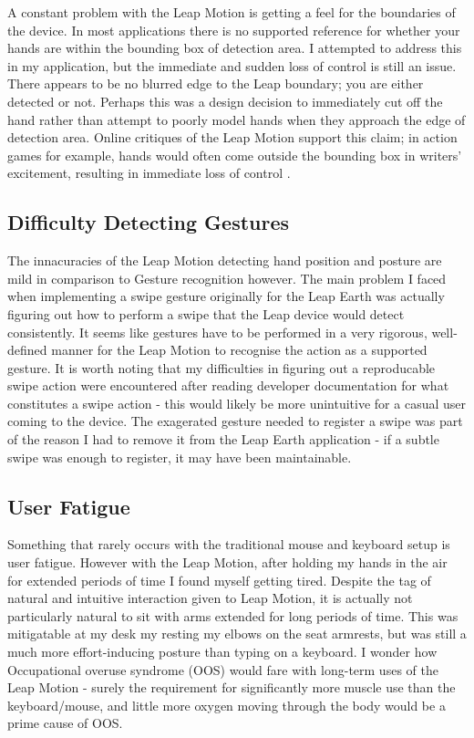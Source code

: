 \documentclass{sigplanconf}
\begin{document}
A constant problem with the Leap Motion is getting a feel for the boundaries of the device. In most applications there is no supported reference for whether your hands are within the bounding box of detection area. I attempted to address this in my application, but the immediate and sudden loss of control is still an issue. There appears to be no blurred edge to the Leap boundary; you are either detected or not. Perhaps this was a design decision to immediately cut off the hand rather than attempt to poorly model hands when they approach the edge of detection area. Online critiques of the Leap Motion support this claim; in action games for example, hands would often come outside the bounding box in writers' excitement, resulting in immediate loss of control \cite{leap_review}. 

\subsection{Difficulty Detecting Gestures}

The innacuracies of the Leap Motion detecting hand position and posture are mild in comparison to Gesture recognition however. The main problem I faced when implementing a swipe gesture originally for the Leap Earth was actually figuring out how to perform a swipe that the Leap device would detect consistently. It seems like gestures have to be performed in a very rigorous, well-defined manner for the Leap Motion to recognise the action as a supported gesture. It is worth noting that my difficulties in figuring out a reproducable swipe action were encountered after reading developer documentation for what constitutes a swipe action - this would likely be more unintuitive for a casual user coming to the device. The exagerated gesture needed to register a swipe was part of the reason I had to remove it from the Leap Earth application - if a subtle swipe was enough to register, it may have been maintainable.

\subsection{User Fatigue}

Something that rarely occurs with the traditional mouse and keyboard setup is user fatigue. However with the Leap Motion, after holding my hands in the air for extended periods of time I found myself getting tired. Despite the tag of natural and intuitive interaction given to Leap Motion, it is actually not particularly natural to sit with arms extended for long periods of time. This was mitigatable at my desk my resting my elbows on the seat armrests, but was still a much more effort-inducing posture than typing on a keyboard. I wonder how Occupational overuse syndrome (OOS) would fare with long-term uses of the Leap Motion - surely the requirement for significantly more muscle use than the keyboard/mouse, and little more oxygen moving through the body would be a prime cause of OOS.
\end{document}
